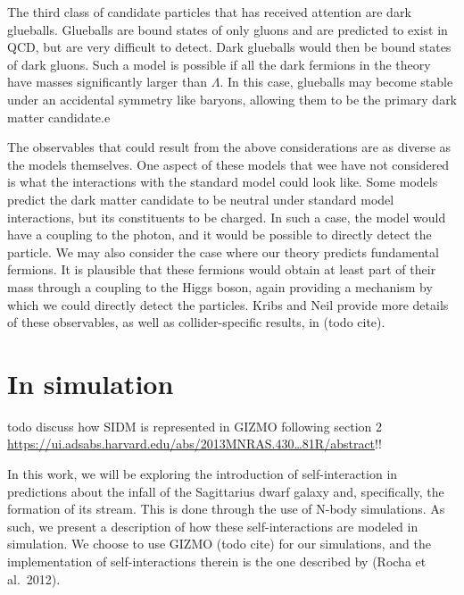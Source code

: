 The third class of candidate particles that has received attention are
dark glueballs. Glueballs are bound states of only gluons and are
predicted to exist in QCD, but are very difficult to detect. Dark
glueballs would then be bound states of dark gluons. Such a model is
possible if all the dark fermions in the theory have masses
significantly larger than \(\Lambda\). In this case, glueballs may
become stable under an accidental symmetry like baryons, allowing them
to be the primary dark matter candidate.e

The observables that could result from the above considerations are as
diverse as the models themselves. One aspect of these models that wee
have not considered is what the interactions with the standard model
could look like. Some models predict the dark matter candidate to be
neutral under standard model interactions, but its constituents to be
charged. In such a case, the model would have a coupling to the photon,
and it would be possible to directly detect the particle. We may also
consider the case where our theory predicts fundamental fermions. It is
plausible that these fermions would obtain at least part of their mass
through a coupling to the Higgs boson, again providing a mechanism by
which we could directly detect the particles. Kribs and Neil provide
more details of these observables, as well as collider-specific results,
in (todo cite).

\hypertarget{in-simulation}{%
\section{In simulation}\label{in-simulation}}

todo discuss how SIDM is represented in GIZMO following section 2
\href{https://ui.adsabs.harvard.edu/abs/2013MNRAS.430...81R/abstract}{https://ui.adsabs.harvard.edu/abs/2013MNRAS.430\ldots{}81R/abstract}!!

In this work, we will be exploring the introduction of self-interaction
in predictions about the infall of the Sagittarius dwarf galaxy and,
specifically, the formation of its stream. This is done through the use
of N-body simulations. As such, we present a description of how these
self-interactions are modeled in simulation. We choose to use GIZMO
(todo cite) for our simulations, and the implementation of
self-interactions therein is the one described by (Rocha et al.~2012).

